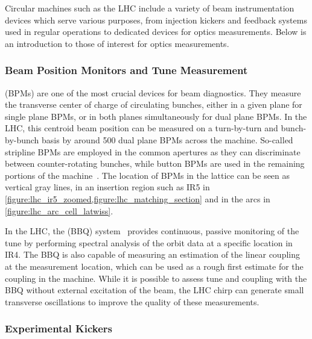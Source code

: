 Circular machines such as the LHC include a variety of beam instrumentation devices which serve various purposes, from injection kickers and feedback systems used in regular operations to dedicated devices for optics measurements.
Below is an introduction to those of interest for optics measurements.

\subsubsection*{Beam Position Monitors and Tune Measurement}

 (BPMs) are one of the most crucial devices for beam diagnostics.
They measure the transverse center of charge of circulating bunches, either in a given plane for single plane BPMs, or in both planes simultaneously for dual plane BPMs.
In the LHC, this centroid beam position can be measured on a turn-by-turn and bunch-by-bunch basis by around \num{500} dual plane BPMs across the machine.
So-called stripline BPMs are employed in the common apertures as they can discriminate between counter-rotating bunches, while button BPMs are used in the remaining portions of the machine~\cite{BOOK:Bruning:LHC_Design_Report_Main_Ring}. 
The location of BPMs in the lattice can be seen as vertical gray lines, in an insertion region such as IR\num{5} in \cref{figure:lhc_ir5_zoomed,figure:lhc_matching_section} and in the arcs in \cref{figure:lhc_arc_cell_latwiss}.

In the LHC, the  (BBQ) system~\cite{CERN:Boccardi:LHC_Transverse_Diagnostics_Systems,CERN:Boccardi:LHC_BBQ_Tune_Chromaticity_Systems} provides continuous, passive monitoring of the tune by performing spectral analysis of the orbit data at a specific location in IR\num{4}.
The BBQ is also capable of measuring an estimation of the linear coupling at the measurement location, which can be used as a rough first estimate for the coupling in the machine.
While it is possible to assess tune and coupling with the BBQ without external excitation of the beam, the LHC chirp can generate small transverse oscillations to improve the quality of these measurements.

\subsubsection*{Experimental Kickers}

